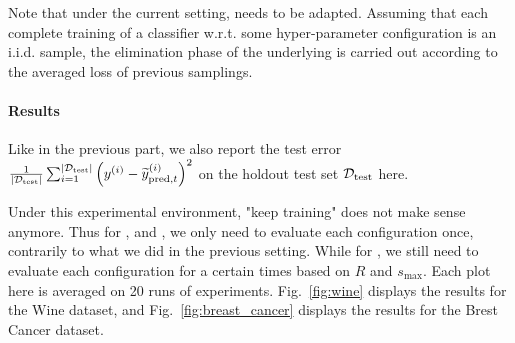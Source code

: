 \documentclass[twoside,11pt]{article}
\begin{document}
Note that under the current setting, \Hyperband needs to be adapted. Assuming that each complete training of a classifier w.r.t. some hyper-parameter configuration is an i.i.d. sample, the elimination phase of the underlying \SHA is carried out according to the averaged loss of previous samplings.

\paragraph{Results}

Like in the previous part, we also report the test error $\frac{1}{|\mathcal{D}_{\operatorname{test}}|} \sum_{i=1}^{|\mathcal{D}_{\operatorname{test}}|} \left(y^{(i)} - \widetilde{y}^{(i)}_{\operatorname{pred},t}\right)^2$ on the holdout test set $\mathcal{D}_{\operatorname{test}}$ here.

Under this experimental environment, "keep training" does not make sense anymore. Thus for \HOO, \TPE and \Random, we only need to evaluate each configuration once, contrarily to what we did in the previous setting. While for \Hyperband, we still need to evaluate each configuration for a certain times based on $R$ and $s_{\max}$. Each plot here is averaged on 20 runs of experiments. Fig.~\ref{fig:wine} displays the results for the Wine dataset, and Fig.~\ref{fig:breast_cancer} displays the results for the Brest Cancer dataset.
\end{document}
